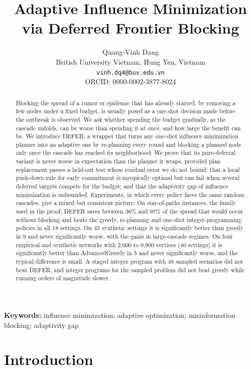 \documentclass[11pt]{article}
\title{Adaptive Influence Minimization via Deferred Frontier Blocking}
\author{Quang-Vinh Dang\\ British University Vietnam, Hung Yen, Vietnam\\ \texttt{vinh.dq4@buv.edu.vn}\\ ORCID: 0000-0002-3877-8024}
\date{}
\theoremstyle{definition}
\theoremstyle{remark}
\begin{document}
\maketitle
\begin{abstract}
Blocking the spread of a rumor or epidemic that has already started, by removing a few nodes under a fixed budget, is usually posed as a one-shot decision made before the outbreak is observed. We ask whether spending the budget gradually, as the cascade unfolds, can be worse than spending it at once, and how large the benefit can be. We introduce DEFER, a wrapper that turns any one-shot influence minimization planner into an adaptive one by re-planning every round and blocking a planned node only once the cascade has reached its neighborhood. We prove that its pure-deferral variant is never worse in expectation than the planner it wraps, provided plan replacement passes a held-out test whose residual error we do not bound; that a local push-down rule for early commitment is myopically optimal but can fail when several deferred targets compete for the budget; and that the adaptivity gap of influence minimization is unbounded. Experiments, in which every policy faces the same random cascades, give a mixed but consistent picture. On star-of-paths instances, the family used in the proof, DEFER saves between 36\% and 97\% of the spread that would occur without blocking and beats the greedy, re-planning and one-shot integer-programming policies in all 18 settings. On 45 synthetic settings it is significantly better than greedy in 9 and never significantly worse, with the gains in large-cascade regimes. On four empirical and synthetic networks with 2,000 to 9,900 vertices (40 settings) it is significantly better than AdvancedGreedy in 5 and never significantly worse, and the typical difference is small. A staged integer program with 48 sampled scenarios did not beat DEFER, and integer programs for the sampled problem did not beat greedy while running orders of magnitude slower.
\end{abstract}
\noindent\textbf{Keywords:} influence minimization; adaptive optimization; misinformation blocking; adaptivity gap

\section{Introduction}\label{sec:intro}
\end{document}
